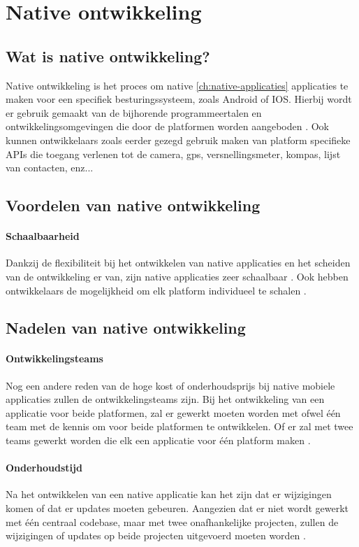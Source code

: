\section{Native ontwikkeling}
\subsection{Wat is native ontwikkeling?}\label{subsec:wat-is-native-ontwikkeling}
Native ontwikkeling is het proces om native \ref{ch:native-applicaties} applicaties te maken 
voor een specifiek besturingssysteem, zoals Android of IOS. Hierbij wordt er gebruik gemaakt van de 
bijhorende programmeertalen en ontwikkelingsomgevingen die door de platformen worden aangeboden 
\autocite{Meirelles2019}. Ook kunnen ontwikkelaars zoals eerder gezegd gebruik maken van 
platform specifieke APIs die toegang verlenen tot de camera, gps, versnellingsmeter, kompas, 
lijst van contacten, enz...

\subsection{Voordelen van native ontwikkeling}
\paragraph{Schaalbaarheid}
Dankzij de flexibiliteit bij het ontwikkelen van native applicaties en het scheiden van 
de ontwikkeling er van, zijn native applicaties zeer schaalbaar \autocite{Koffer2023}. 
Ook hebben ontwikkelaars de mogelijkheid om elk platform individueel te schalen \autocite{Sakovich2023}. 

\subsection{Nadelen van native ontwikkeling}
\paragraph{Ontwikkelingsteams}
Nog een andere reden van de hoge kost of onderhoudsprijs bij native mobiele applicaties 
zullen de ontwikkelingsteams zijn. Bij het ontwikkeling van een applicatie voor beide 
platformen, zal er gewerkt moeten worden met ofwel één team met de kennis om voor beide 
platformen te ontwikkelen. Of er zal met twee teams gewerkt worden die elk een applicatie 
voor één platform maken \autocite{Kotlin2023}.

\paragraph{Onderhoudstijd}
Na het ontwikkelen van een native applicatie kan het zijn dat er wijzigingen komen of 
dat er updates moeten gebeuren. Aangezien dat er niet wordt gewerkt met één centraal codebase, maar 
met twee onafhankelijke projecten, zullen de wijzigingen of updates op beide projecten 
uitgevoerd moeten worden \autocite{Kotlin2023}.

